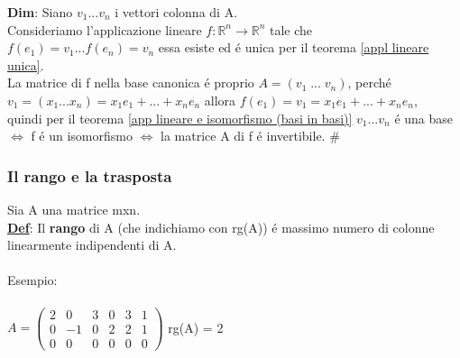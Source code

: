 \documentclass[12pt]{article}
\begin{document}
\noindent \textbf{Dim}: Siano $v_1...v_n$ i vettori colonna di A. \\
Consideriamo l'applicazione lineare $f: \mathbb{R}^n \longrightarrow \mathbb{R}^n$ tale che $f(e_1) = v_1...f(e_n) = v_n$ essa esiste ed é unica per il teorema \ref{appl lineare unica}.\\La matrice di f nella base canonica é proprio $A = (v_1\;...\;v_n)$, perché\\ 
$v_1 = (x_1...x_n) = x_1e_1+...+x_ne_n$ allora $f(e_1) = v_1 = x_1e_1+...+x_ne_n$,\\
quindi per il teorema \ref{app lineare e isomorfismo (basi in basi)} $v_1...v_n$ é una base $\iff$ f é un isomorfismo $\iff$ la matrice A di f é invertibile. \#
\subsubsection{Il rango e la trasposta}
Sia A una matrice mxn.\\
\underline{\textbf{Def}}: Il \textbf{rango} di A (che indichiamo con rg(A)) é massimo numero di colonne linearmente indipendenti di A.\\\\
Esempio:\\\\
$A = \begin{pmatrix}
    2 & 0 & 3 & 0 & 3 & 1\\
    0 & -1 & 0 & 2 & 2 & 1\\
     0 & 0 & 0 & 0 & 0 & 0
\end{pmatrix}$
rg(A) = 2\\\\
\end{document}
